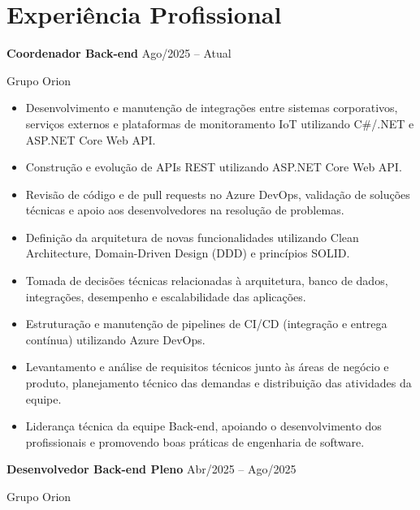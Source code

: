 \documentclass[11pt,a4paper]{article}
\begin{document}
\section{Experiência Profissional}

\textbf{Coordenador Back-end}
\hfill Ago/2025 -- Atual

Grupo Orion

\begin{itemize}[leftmargin=*,noitemsep,topsep=2pt]

\item Desenvolvimento e manutenção de integrações entre sistemas corporativos, serviços externos e plataformas de monitoramento IoT utilizando C\#/.NET e ASP.NET Core Web API.

\item Construção e evolução de APIs REST utilizando ASP.NET Core Web API.

\item Revisão de código e de pull requests no Azure DevOps, validação de soluções técnicas e apoio aos desenvolvedores na resolução de problemas.

\item Definição da arquitetura de novas funcionalidades utilizando Clean Architecture, Domain-Driven Design (DDD) e princípios SOLID.

\item Tomada de decisões técnicas relacionadas à arquitetura, banco de dados, integrações, desempenho e escalabilidade das aplicações.

\item Estruturação e manutenção de pipelines de CI/CD (integração e entrega contínua) utilizando Azure DevOps.

\item Levantamento e análise de requisitos técnicos junto às áreas de negócio e produto, planejamento técnico das demandas e distribuição das atividades da equipe.

\item Liderança técnica da equipe Back-end, apoiando o desenvolvimento dos profissionais e promovendo boas práticas de engenharia de software.

\end{itemize}

\vspace{0.4cm}

\textbf{Desenvolvedor Back-end Pleno}
\hfill Abr/2025 -- Ago/2025

Grupo Orion
\end{document}
